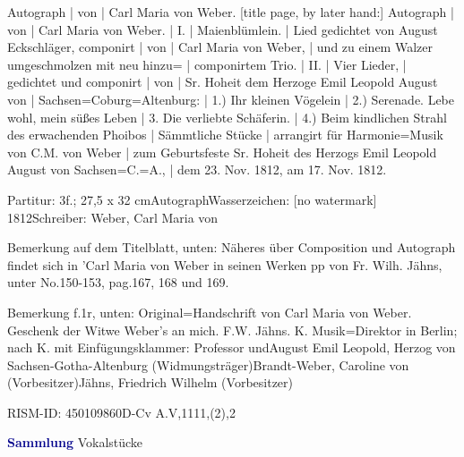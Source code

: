 \documentclass[a4paper, twocolumn, 11pt]{book}
\begin{document}
\par \begin{itshape} Autograph | von | Carl Maria von Weber. [title page, by later hand:] Autograph | von | Carl Maria von Weber. | I. | Maienblümlein. | Lied gedichtet von August Eckschläger, componirt | von | Carl Maria von Weber, | und zu einem Walzer umgeschmolzen mit neu hinzu= | componirtem Trio. | II. | Vier Lieder, | gedichtet und componirt | von | Sr. Hoheit dem Herzoge Emil Leopold August von | Sachsen=Coburg=Altenburg: | 1.) {\textquotedbl}Ihr kleinen Vögelein{\textquotedbl} | 2.) Serenade. {\textquotedbl}Lebe wohl, mein süßes Leben{\textquotedbl} | 3. Die verliebte Schäferin. | 4.) {\textquotedbl}Beim kindlichen Strahl des erwachenden Phoibos{\textquotedbl} | Sämmtliche Stücke | arrangirt für Harmonie=Musik von C.M. von Weber | zum Geburtsfeste Sr. Hoheit des Herzogs Emil Leopold August von Sachsen=C.=A., | dem 23. Nov. 1812, am 17. Nov. 1812.\end{itshape} 
\par \textcolor{darkblue}{}  Partitur: 3f.; 27,5 x 32 cm\newline Autograph\newline Wasserzeichen: [no watermark]  1812\newline Schreiber: Weber, Carl Maria von
\par Bemerkung auf dem Titelblatt, unten: Näheres über Composition und Autograph findet sich in {\textquotedbl}'Carl Maria von Weber in seinen Werken pp{\textquotedbl} von Fr. Wilh. Jähns, unter No.150-153, pag.167, 168 und 169.
\par Bemerkung f.1r, unten: {\textquotedbl}Original=Handschrift von Carl Maria von Weber. Geschenk der Witwe Weber's an mich. F.W. Jähns. K. Musik=Direktor in Berlin{\textquotedbl}; nach {\textquotedbl}K.{\textquotedbl} mit Einfügungsklammer: {\textquotedbl}Professor und{\textquotedbl}\newline August Emil Leopold, Herzog von Sachsen-Gotha-Altenburg  (Widmungsträger)\newline Brandt-Weber, Caroline von  (Vorbesitzer)\newline Jähns, Friedrich Wilhelm  (Vorbesitzer)
\par RISM-ID: 450109860\newline D-Cv  A.V,1111,(2),2
\par \vspace{16pt} \textcolor{darkblue}{\textbf{Sammlung}} Vokalstücke
\end{document}
